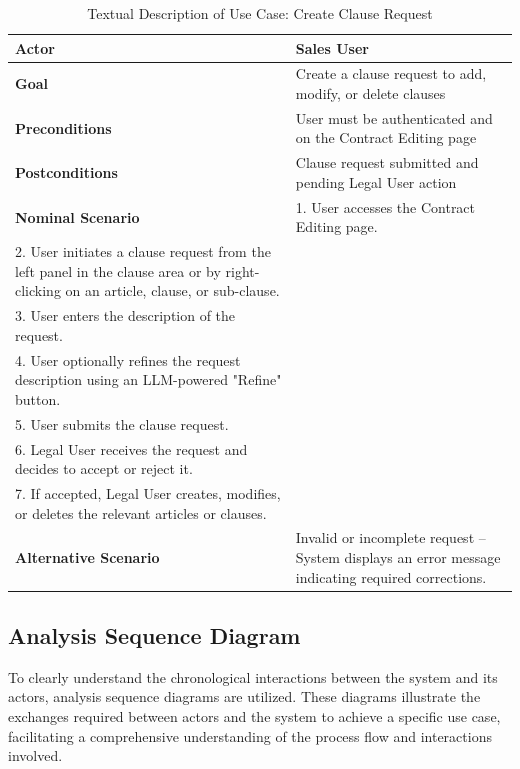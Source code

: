 \begin{table}[ht!]
    \centering
    \small
    \begin{tabularx}{\textwidth}{|l|X|}
        \hline
        \textbf{Actor} & Sales User \\
        \hline
        \textbf{Goal} & Create a clause request to add, modify, or delete clauses \\
        \hline
        \textbf{Preconditions} & User must be authenticated and on the Contract Editing page \\
        \hline
        \textbf{Postconditions} & Clause request submitted and pending Legal User action \\
        \hline
        \textbf{Nominal Scenario} &
            1. User accesses the Contract Editing page.\\[3pt]
            2. User initiates a clause request from the left panel in the clause area or by right-clicking on an article, clause, or sub-clause.\\[3pt]
            3. User enters the description of the request.\\[3pt]
            4. User optionally refines the request description using an LLM-powered "Refine" button.\\[3pt]
            5. User submits the clause request.\\[3pt]
            6. Legal User receives the request and decides to accept or reject it.\\[3pt]
            7. If accepted, Legal User creates, modifies, or deletes the relevant articles or clauses.\\
        \hline
        \textbf{Alternative Scenario} & Invalid or incomplete request – System displays an error message indicating required corrections. \\
        \hline
    \end{tabularx}
    \caption{Textual Description of Use Case: Create Clause Request}
    \label{tab:create_clause_request}
\end{table}

\subsection{Analysis Sequence Diagram}
To clearly understand the chronological interactions between the system and its actors, analysis sequence diagrams are utilized. These diagrams illustrate the exchanges required between actors and the system to achieve a specific use case, facilitating a comprehensive understanding of the process flow and interactions involved.

